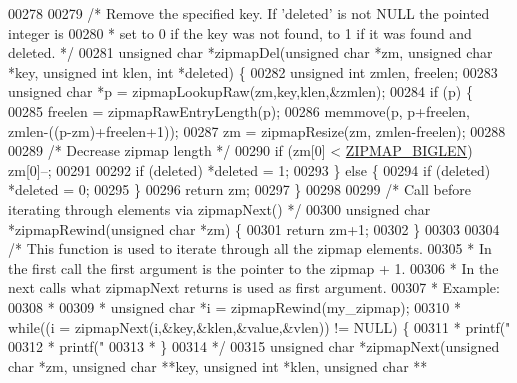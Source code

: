 \begin{DoxyCode}
00278 
00279 \textcolor{comment}{/* Remove the specified key. If 'deleted' is not NULL the pointed integer is}
00280 \textcolor{comment}{ * set to 0 if the key was not found, to 1 if it was found and deleted. */}
00281 \textcolor{keywordtype}{unsigned} \textcolor{keywordtype}{char} *zipmapDel(\textcolor{keywordtype}{unsigned} \textcolor{keywordtype}{char} *zm, \textcolor{keywordtype}{unsigned} \textcolor{keywordtype}{char} *key, \textcolor{keywordtype}{unsigned} \textcolor{keywordtype}{int} klen, \textcolor{keywordtype}{int} *deleted) \{
00282     \textcolor{keywordtype}{unsigned} \textcolor{keywordtype}{int} zmlen, freelen;
00283     \textcolor{keywordtype}{unsigned} \textcolor{keywordtype}{char} *p = zipmapLookupRaw(zm,key,klen,&zmlen);
00284     \textcolor{keywordflow}{if} (p) \{
00285         freelen = zipmapRawEntryLength(p);
00286         memmove(p, p+freelen, zmlen-((p-zm)+freelen+1));
00287         zm = zipmapResize(zm, zmlen-freelen);
00288 
00289         \textcolor{comment}{/* Decrease zipmap length */}
00290         \textcolor{keywordflow}{if} (zm[0] < \hyperlink{zipmap_8c_a1173592dbfaa84c6b2419d0a699c97f5}{ZIPMAP\_BIGLEN}) zm[0]--;
00291 
00292         \textcolor{keywordflow}{if} (deleted) *deleted = 1;
00293     \} \textcolor{keywordflow}{else} \{
00294         \textcolor{keywordflow}{if} (deleted) *deleted = 0;
00295     \}
00296     \textcolor{keywordflow}{return} zm;
00297 \}
00298 
00299 \textcolor{comment}{/* Call before iterating through elements via zipmapNext() */}
00300 \textcolor{keywordtype}{unsigned} \textcolor{keywordtype}{char} *zipmapRewind(\textcolor{keywordtype}{unsigned} \textcolor{keywordtype}{char} *zm) \{
00301     \textcolor{keywordflow}{return} zm+1;
00302 \}
00303 
00304 \textcolor{comment}{/* This function is used to iterate through all the zipmap elements.}
00305 \textcolor{comment}{ * In the first call the first argument is the pointer to the zipmap + 1.}
00306 \textcolor{comment}{ * In the next calls what zipmapNext returns is used as first argument.}
00307 \textcolor{comment}{ * Example:}
00308 \textcolor{comment}{ *}
00309 \textcolor{comment}{ * unsigned char *i = zipmapRewind(my\_zipmap);}
00310 \textcolor{comment}{ * while((i = zipmapNext(i,&key,&klen,&value,&vlen)) != NULL) \{}
00311 \textcolor{comment}{ *     printf("%
00312 \textcolor{comment}{ *     printf("%
00313 \textcolor{comment}{ * \}}
00314 \textcolor{comment}{ */}
00315 \textcolor{keywordtype}{unsigned} \textcolor{keywordtype}{char} *zipmapNext(\textcolor{keywordtype}{unsigned} \textcolor{keywordtype}{char} *zm, \textcolor{keywordtype}{unsigned} \textcolor{keywordtype}{char} **key, \textcolor{keywordtype}{unsigned} \textcolor{keywordtype}{int} *klen, \textcolor{keywordtype}{unsigned} \textcolor{keywordtype}{char} **
}}
\end{DoxyCode}
